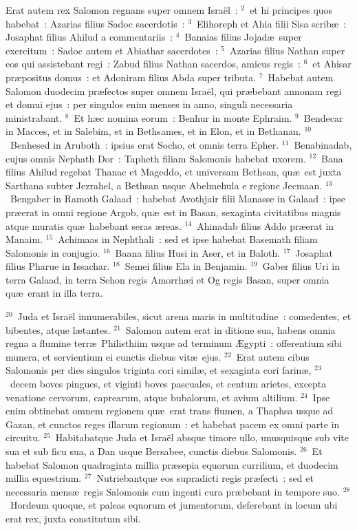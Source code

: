 \lettrine[lines=10,image=true,loversize=0.05,lraise=-0.03]{E}{}rat autem rex Salomon regnans super omnem Isra\"el~:
${}^{2}$~et hi principes quos habebat~: Azarias filius Sadoc sacerdotis~:
${}^{3}$~Elihoreph et Ahia filii Sisa scrib\ae~: Josaphat filius Ahilud a commentariis~:
${}^{4}$~Banaias filius Jojad\ae\ super exercitum~: Sadoc autem et Abiathar sacerdotes~:
${}^{5}$~Azarias filius Nathan super eos qui assistebant regi~: Zabud filius Nathan sacerdos, amicus regis~:
${}^{6}$~et Ahisar pr\ae positus domus~: et Adoniram filius Abda super tributa.
${}^{7}$~Habebat autem Salomon duodecim pr\ae fectos super omnem Isra\"el, qui pr\ae bebant annonam regi et domui ejus~: per singulos enim menses in anno, singuli necessaria ministrabant.
${}^{8}$~Et h\ae c nomina eorum~: Benhur in monte Ephraim.
${}^{9}$~Bendecar in Macces, et in Salebim, et in Bethsames, et in Elon, et in Bethanan.
${}^{10}$~Benhesed in Aruboth~: ipsius erat Socho, et omnis terra Epher.
${}^{11}$~Benabinadab, cujus omnis Nephath Dor~: Tapheth filiam Salomonis habebat uxorem.
${}^{12}$~Bana filius Ahilud regebat Thanac et Mageddo, et universam Bethsan, qu\ae\ est juxta Sarthana subter Jezrahel, a Bethsan usque Abelmehula e regione Jecmaan.
${}^{13}$~Bengaber in Ramoth Galaad~: habebat Avothjair filii Manasse in Galaad~: ipse pr\ae erat in omni regione Argob, qu\ae\ est in Basan, sexaginta civitatibus magnis atque muratis qu\ae\ habebant seras \ae reas.
${}^{14}$~Ahinadab filius Addo pr\ae erat in Manaim.
${}^{15}$~Achimaas in Nephthali~: sed et ipse habebat Basemath filiam Salomonis in conjugio.
${}^{16}$~Baana filius Husi in Aser, et in Baloth.
${}^{17}$~Josaphat filius Pharue in Issachar.
${}^{18}$~Semei filius Ela in Benjamin.
${}^{19}$~Gaber filius Uri in terra Galaad, in terra Sehon regis Amorrh\ae i et Og regis Basan, super omnia qu\ae\ erant in illa terra.


${}^{20}$~Juda et Isra\"el innumerabiles, sicut arena maris in multitudine~: comedentes, et bibentes, atque l\ae tantes.
${}^{21}$~Salomon autem erat in ditione sua, habens omnia regna a flumine terr\ae\ Philisthiim usque ad terminum \AE gypti~: offerentium sibi munera, et servientium ei cunctis diebus vit\ae\ ejus.
${}^{22}$~Erat autem cibus Salomonis per dies singulos triginta cori simil\ae , et sexaginta cori farin\ae ,
${}^{23}$~decem boves pingues, et viginti boves pascuales, et centum arietes, excepta venatione cervorum, caprearum, atque bubalorum, et avium altilium.
${}^{24}$~Ipse enim obtinebat omnem regionem qu\ae\ erat trans flumen, a Thaphsa usque ad Gazan, et cunctos reges illarum regionum~: et habebat pacem ex omni parte in circuitu.
${}^{25}$~Habitabatque Juda et Isra\"el absque timore ullo, unusquisque sub vite sua et sub ficu sua, a Dan usque Bersabee, cunctis diebus Salomonis.
${}^{26}$~Et habebat Salomon quadraginta millia pr\ae sepia equorum currilium, et duodecim millia equestrium.
${}^{27}$~Nutriebantque eos supradicti regis pr\ae fecti~: sed et necessaria mens\ae\ regis Salomonis cum ingenti cura pr\ae bebant in tempore suo.
${}^{28}$~Hordeum quoque, et paleas equorum et jumentorum, deferebant in locum ubi erat rex, juxta constitutum sibi.


